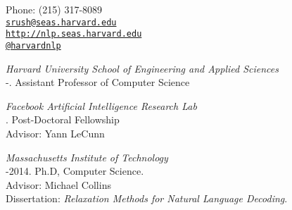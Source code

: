 \documentclass[11pt]{article}
\makeatletter
\def\myemail{srush@seas.harvard.edu}
\def\myweb{http://nlp.seas.harvard.edu}
\def\myphone{(215) 317-8089}
\def\myfax{harvardnlp}
\makeatother
\begin{document}
\begin{minipage}[t]{2.95in}
  
\end{minipage}
\hfill     
\hfill
\begin{minipage}[t]{1.7in}
  \flushright \footnotesize Phone: \myphone \\ 
  {\scriptsize  \texttt{\href{mailto:\myemail}{\myemail}}} \\
  {\scriptsize  \texttt{\href{\myweb}{\myweb}}} \\
  {\scriptsize  \texttt{\href{http://twitter.com/\myfax}{@\myfax}}} \\
\end{minipage}


\medskip

\reversemarginpar



\noindent\emph{Harvard University School of Engineering and Applied Sciences \vspace{0.01in}}\\
-.  Assistant Professor of Computer Science

\medskip       
\noindent\emph{Facebook Artificial Intelligence Research Lab \vspace{0.01in}}\\
.  Post-Doctoral Fellowship\\
\ind Advisor: Yann LeCunn

\bigskip

 
\noindent\emph{Massachusetts Institute of Technology \vspace{0.01in}}\\
-2014.  Ph.D, Computer Science.\\
\ind Advisor: Michael Collins\\
\ind Dissertation: \emph{Relaxation Methods for Natural Language Decoding}. %
\end{document}
